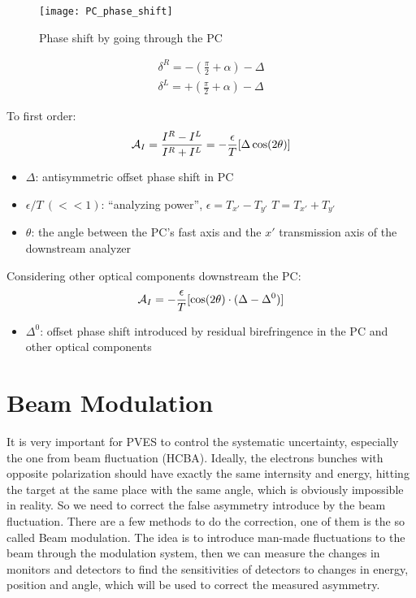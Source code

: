 \begin{figure}[h!]
    \texttt{[image: PC\_phase\_shift]}
    \caption{Phase shift by going through the PC}
\end{figure}

\begin{equation*}
    \begin{gathered}
	\delta^R = -\left(\frac{\pi}{2} + \alpha \right) - \Delta \\
	\delta^L = +\left(\frac{\pi}{2} + \alpha \right) - \Delta
    \end{gathered}
\end{equation*}

To first order:
\begin{equation*}
    \begin{gathered}
    \mathcal{A}_{I} = \frac{I^R - I^L}{I^R + I^L} = -\frac{\epsilon}{T}[\Delta\cos(2\theta)]	\\
    \end{gathered}
\end{equation*}
\bigskip
\begin{itemize}
    \item $\Delta$: antisymmetric offset phase shift in PC
    \item $\epsilon/T \ (<<1)$: ``analyzing power'', $\epsilon = T_{x'} - T_{y'}$ $T = T_{x'} + T_{y'}$
    \item $\theta$: the angle between the PC's fast axis and the $x'$ transmission axis of the downstream analyzer
\end{itemize}

Considering other optical components downstream the PC:
\begin{equation*}
    \mathcal{A}_{I} = -\frac{\epsilon}{T}[\cos(2\theta) \cdot (\Delta - \Delta^0)]
\end{equation*}
\begin{itemize}
    \item $\Delta^0$: offset phase shift introduced by residual birefringence in the PC and other optical components
\end{itemize}
\section{Beam Modulation}
It is very important for PVES to control the systematic uncertainty, especially
the one from beam fluctuation (HCBA). Ideally, the electrons bunches with opposite
polarization should have exactly the same internsity and energy, hitting the target 
at the same place with the same angle, which is obviously impossible in reality. 
So we need to correct the false asymmetry introduce by the beam fluctuation. There are a
few methods to do the correction, one of them is the so called Beam modulation.
The idea is to introduce man-made fluctuations to the beam through the 
modulation system, then we can measure the changes in monitors and detectors 
to find the sensitivities of detectors to changes in energy, position and angle,
which will be used to correct the measured asymmetry.

